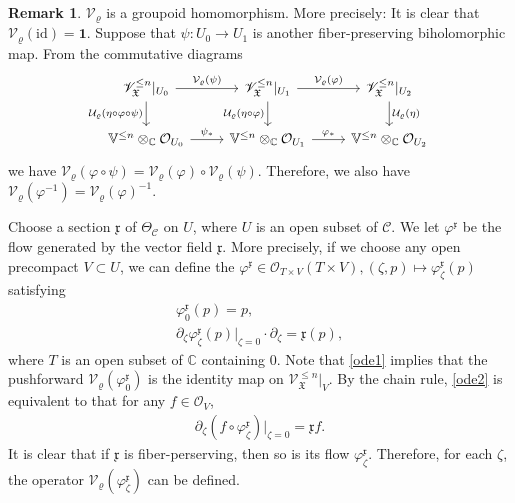 \documentclass[11pt,b5paper,notitlepage]{article}
\theoremstyle{definition}
\newtheorem{rem}[df]{Remark}
\theoremstyle{plain}
\newcommand{\fk}{\mathfrak}
\newcommand{\mc}{\mathcal}
\newcommand{\idt}{\mathbf{1}}
\newcommand{\SV}{\mathscr{V}}
\newcommand{\scr}{\mathscr}
\newcommand{\xk}{\mathfrak x}
\newcommand{\Vbb}{\mathbb V}
\newcommand{\Cbb}{\mathbb C}
\newcommand{\<}{\left\langle}
\renewcommand{\>}{\right\rangle}
\newcommand{\MO}{\mathcal{O}}
\newcommand{\MC}{\mathcal{C}}
\newcommand{\fx}{\mathfrak{X}}
\newcommand{\MV}{\mathcal{V}}
\newcommand{\id}{\mathrm{id}}
\numberwithin{equation}{section}
\begin{document}
\begin{rem}\label{mc1}
$\mc V_\varrho$ is a groupoid homomorphism. More precisely: It is clear that $\mc V_\varrho(\id)=\idt$.  Suppose that $\psi:U_0\rightarrow U_1$ is another fiber-preserving biholomorphic map. From the commutative diagrams
\begin{equation*}
\begin{tikzcd}
\scr V_{\fk X}^{\leq n}|_{U_0}\arrow[r,"\mc V_\varrho(\psi)"] \arrow[d,"\mc U_\varrho(\eta\circ\varphi\circ\psi)"']&\scr V_{\fk X}^{\leq n}|_{U_1} \arrow[r,"\mc V_\varrho(\varphi)"] \arrow[d,"\mc U_\varrho(\eta\circ\varphi)"'] & \scr V_\fx^{\leq n}|_{U_2} \arrow[d,"\mc U_\varrho(\eta)"] \\
\Vbb^{\leq n}\otimes_\Cbb\mc O_{U_0}\arrow[r,"\psi_*"]&\Vbb^{\leq n}\otimes_\Cbb\mc O_{U_1} \arrow[r,"{\varphi_*}"]           & \Vbb^{\leq n}\otimes_\Cbb\mc O_{U_2}         
\end{tikzcd}
\end{equation*}
we have $\mc V_\varrho(\varphi\circ\psi)=\MV_\varrho(\varphi)\circ\MV_\varrho(\psi)$. Therefore, we also have $\MV_\varrho(\varphi^{-1})=\MV_\varrho(\varphi)^{-1}$.
\end{rem}



Choose a section $\xk$ of $\Theta_{\MC}$ on $U$, where $U$ is an open subset of $\MC$. We let $\varphi^\xk$ be the flow generated by the vector field $\xk$. More precisely, if we choose any open precompact $V\subset U$, we can define the $\varphi^\xk\in \MO_{T\times V}(T\times V),(\zeta,p)\mapsto \varphi_\zeta^\xk(p)$ satisfying
\begin{subequations}
    \begin{gather}
    \varphi_0^\xk(p)=p, \label{ode1} \\
    \partial_\zeta \varphi_\zeta^\xk(p)\vert_{\zeta=0}\cdot\partial_\zeta=\xk(p),\label{ode2}
\end{gather}
\end{subequations}
where $T$ is an open subset of $\Cbb$ containing 0. Note that \eqref{ode1} implies that the pushforward $\MV_\varrho(\varphi_0^\xk)$ is the identity map on $\SV_\fx^{\leq n}\vert_V$. By the chain rule, \eqref{ode2} is equivalent to that for any $f\in\MO_V$,
\begin{align}\label{eqb18}
    \partial_{\zeta}(f\circ \varphi_\zeta^\xk)\vert_{\zeta=0}=\xk f.
\end{align}
It is clear that if $\xk$ is fiber-perserving, then so is its flow $\varphi_\zeta^\xk$. Therefore, for each $\zeta$, the operator $\mc V_\varrho(\varphi_\zeta^\xk)$ can be defined.
\end{document}
